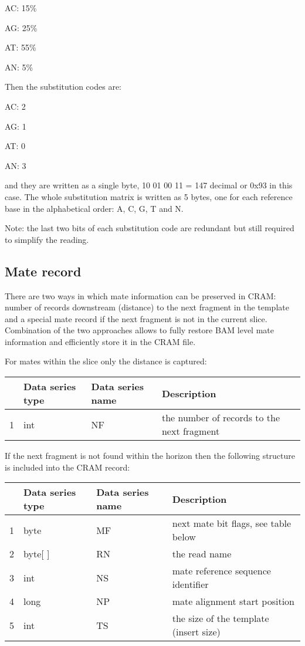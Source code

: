\documentclass[a4paper]{article}
\begin{document}
AC: 15\%

AG: 25\%

AT: 55\%

AN: 5\%

Then the substitution codes are: 

AC: 2

AG: 1

AT: 0

AN: 3

and they are written as a single byte, 10 01 00 11 = 147 decimal or 0x93 in this 
case. The whole substitution matrix is written as 5 bytes, one for each reference 
base in the alphabetical order: A, C, G, T and N.

Note: the last two bits of each substitution code are redundant but still required 
to simplify the reading. 

\subsection{\textbf{Mate record}}

There are two ways in which mate information can be preserved in CRAM: number of 
records downstream (distance) to the next fragment in the template and a special 
mate record if the next fragment is not in the current slice. Combination of the 
two approaches allows to fully restore BAM level mate information and efficiently 
store it in the CRAM file. 

For mates within the slice only the distance is captured:

\begin{tabular}{|>{\raggedright}p{7pt}|>{\raggedright}p{68pt}|>{\raggedright}p{115pt}|>{\raggedright}p{228pt}|}
\hline
 & \textbf{Data series type} & \textbf{Data series name} & \textbf{Description}\tabularnewline
\hline
1 & int & NF & the number of records to the next fragment\tabularnewline
\hline
\end{tabular}

If the next fragment is not found within the horizon then the following structure 
is included into the CRAM record:

\begin{tabular}{|>{\raggedright}p{6pt}|>{\raggedright}p{66pt}|>{\raggedright}p{117pt}|>{\raggedright}p{228pt}|}
\hline
 & \textbf{Data series type} & \textbf{Data series name} & \textbf{Description}\tabularnewline
\hline
1 & byte & MF & next mate bit flags, see table below\tabularnewline
\hline
2 & byte[ ] & RN & the read name\tabularnewline
\hline
3 & int & NS & mate reference sequence identifier \tabularnewline
\hline
4 & long & NP & mate alignment start position \tabularnewline
\hline
5 & int & TS & the size of the template (insert size)\tabularnewline
\hline
\end{tabular}
\end{document}
